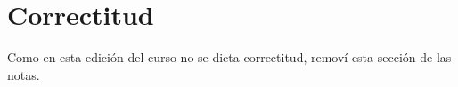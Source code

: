\section{Correctitud}

Como en esta edición del curso no se dicta correctitud, removí esta sección de las notas.
